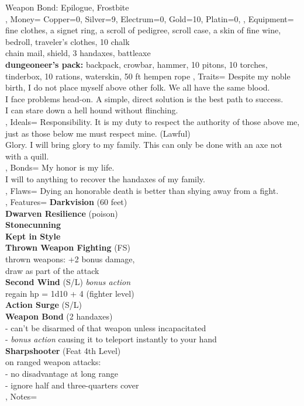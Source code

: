 \documentclass[10pt,a4paper]{scrbook}
\begin{document}
{{{				Weapon Bond: Epilogue, Frostbite\\
			}
		},
		Money={
			Copper=0,
			Silver=9,
			Electrum=0,
			Gold=10,
			Platin=0,
		},
		Equipment={
			fine clothes, a signet ring, a scroll of pedigree, scroll case, a skin of fine wine, bedroll, traveler's clothes, 10 chalk\\
			chain mail, shield, 3 handaxes, battleaxe\\
			\textbf{dungeoneer's pack:} backpack, crowbar, hammer, 10 pitons, 10 torches, tinderbox, 10 rations, waterskin, 50 ft hempen rope
		},
		Traits={
			\tiny
			Despite my noble birth, I do not place myself above other folk. We all have the same blood.\\
			I face problems head-on. A simple, direct solution is the best path to success.\\
			I can stare down a hell hound without flinching.\\
		},
		Ideals={
			\tiny
			Responsibility. It is my duty to respect the authority of those above me, just as those below me must respect mine. (Lawful)\\
			Glory. I will bring glory to my family. This can only be done with an axe not with a quill.\\
		},
		Bonds={
			My honor is my life.\\
			I will to anything to recover the handaxes of my family.\\
		},
		Flaws={
			Dying an honorable death is better than shying away from a fight.\\
		},
		Features={
			\textbf{Darkvision} (60 feet)\\
			\textbf{Dwarven Resilience} (poison)\\
			\textbf{Stonecunning}\\
			\textbf{Kept in Style}\\
			\textbf{Thrown Weapon Fighting} (FS)\\
			thrown weapons: +2 bonus damage,\\
			draw as part of the attack\\
			\textbf{Second Wind} (S/L) \textit{bonus action}\\
			regain hp = 1d10 + 4 (fighter level)\\
			\textbf{Action Surge} (S/L)\\
			\textbf{Weapon Bond} (2 handaxes)\\
			- can't be disarmed of that weapon unless incapacitated\\
			- \textit{bonus action} causing it to teleport instantly to your hand\\
			\textbf{Sharpshooter} (Feat 4th Level)\\
			on ranged weapon attacks:\\
			- no disadvantage at long range\\
			- ignore half and three-quarters cover\\
		},
		Notes={
		}
	}
\end{document}
